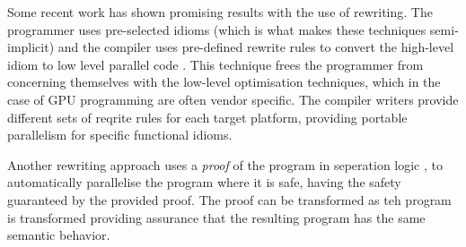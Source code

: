 Some recent work has shown promising results with the use of rewriting. The
programmer uses pre-selected idioms (which is what makes these techniques
semi-implicit) and the compiler uses pre-defined rewrite rules to convert the
high-level idiom to low level parallel code . This technique frees
the programmer from concerning themselves with the low-level optimisation
techniques, which in the case of GPU programming are often vendor specific. The
compiler writers provide different sets of reqrite rules for each target
platform, providing portable parallelism for specific functional idioms.

Another rewriting approach uses a \emph{proof} of the program in seperation
logic \citep{hurlinProof}, to automatically parallelise the program where
it is safe, having the safety guaranteed by the provided proof. The proof can
be transformed as teh program is transformed providing assurance that the
resulting program has the same semantic behavior.

